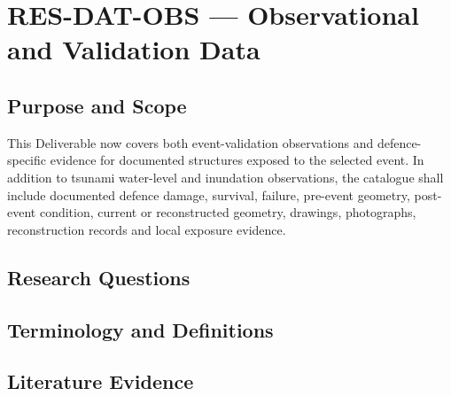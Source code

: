 
\section{RES-DAT-OBS --- Observational and Validation Data}
\label{sec:res-dat-obs}

\subsection{Purpose and Scope}
\label{sec:res-dat-obs-purpose}

This Deliverable now covers both event-validation observations and
defence-specific evidence for documented structures exposed to the selected
event. In addition to tsunami water-level and inundation observations, the
catalogue shall include documented defence damage, survival, failure,
pre-event geometry, post-event condition, current or reconstructed geometry,
drawings, photographs, reconstruction records and local exposure evidence.

\subsection{Research Questions}
\label{sec:res-dat-obs-research-questions}


\subsection{Terminology and Definitions}
\label{sec:res-dat-obs-definitions}


\subsection{Literature Evidence}
\label{sec:res-dat-obs-literature-evidence}

